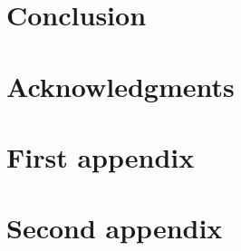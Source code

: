 \documentclass[a4paper,11pt, titlepage]{article}
\theoremstyle{definition}
\theoremstyle{plain}
\theoremstyle{remark}
\begin{document}
\section{Conclusion}

\section*{Acknowledgments}

\appendix

\section{First appendix}
\label{sec:appendix1}

\section{Second appendix}
\label{sec:appendix2}


\end{document}
